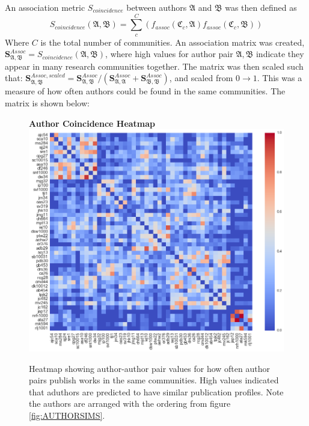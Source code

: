 An association metric $S_{coincidence}$ between authors $\mathfrak{A}$ and $\mathfrak{B}$ was then defined as $$S_{coincidence}\left( \mathfrak{A} , \mathfrak{B} \right) = \sum_c^C \left(f_{assoc} \left( \mathfrak{C}_c , \mathfrak{A} \right) f_{assoc}\left( \mathfrak{C}_c , \mathfrak{B} \right) \right) $$
Where $C$ is the total number of communities. An association matrix was created, $\mathbf{S}^{Assoc}_{\mathfrak{A} , \mathfrak{B}} = S_{coincidence}\left( \mathfrak{A} , \mathfrak{B} \right)$, where high values for author pair $\mathfrak{A} , \mathfrak{B}$ indicate they appear in many research communities together. The matrix was then scaled such that: $\mathbf{S}^{Assoc,scaled}_{\mathfrak{A} , \mathfrak{B}} =  \mathbf{S}^{Assoc}_{\mathfrak{A} , \mathfrak{B}} /  \left( \mathbf{S}^{Assoc}_{\mathfrak{A} , \mathfrak{A}} + \mathbf{S}^{Assoc}_{\mathfrak{B} , \mathfrak{B}} \right) $, and scaled from $0 \rightarrow 1$. This was a measure of how often authors could be found in the same communities. The matrix is shown below:
\begin{center}
\begin{figure}[H]
  \centering
  \textbf{Author Coincidence Heatmap}
    \includegraphics[width=\textwidth]{Analysis/author_comm_heatmap.png}
    \caption[Author Coincidence Matrix Heatmap]{Heatmap showing author-author pair values for how often author pairs publish works in the same communities. High values indicated that aduthors are predicted to have similar publication profiles. Note the authors are arranged with the ordering from figure \ref{fig:AUTHORSIMS}.}
    \label{fig:commHEATMAP}
\end{figure} 
\end{center}
